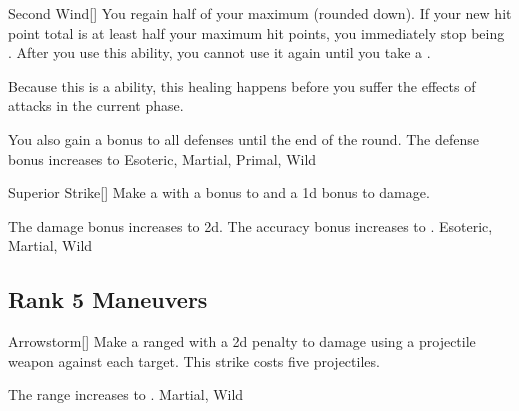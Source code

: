 \lowercase{\hypertarget{maneuver:Second Wind}{}}\label{maneuver:Second Wind}
\hypertarget{maneuver:Second Wind}{}
\begin{apability}[Rank 4]{Second Wind}[]
You regain half of your maximum  (rounded down).
If your new hit point total is at least half your maximum hit points, you immediately stop being .
After you use this ability, you cannot use it again until you take a .

Because this is a  ability, this healing happens before you suffer the effects of attacks in the current phase.

\rankline
{} You also gain a  bonus to all defenses until the end of the round.
 The defense bonus increases to 
 Esoteric, Martial, Primal, Wild
\end{apability}
\vspace{0.25em}



\lowercase{\hypertarget{maneuver:Superior Strike}{}}\label{maneuver:Superior Strike}
\hypertarget{maneuver:Superior Strike}{}
\begin{freeability}[Rank 4]{Superior Strike}[]
Make a  with a  bonus to  and a \plus1d bonus to damage.

\rankline
{} The damage bonus increases to \plus2d.
 The accuracy bonus increases to .
 Esoteric, Martial, Wild
\end{freeability}
\vspace{0.25em}


\subsection{Rank 5 Maneuvers}

\lowercase{\hypertarget{maneuver:Arrowstorm}{}}\label{maneuver:Arrowstorm}
\hypertarget{maneuver:Arrowstorm}{}
\begin{freeability}[Rank 5]{Arrowstorm}[]
Make a ranged  with a \minus2d penalty to damage using a projectile weapon against each target.
This strike costs five projectiles.

\rankline
{} The range increases to \rnglong.
 Martial, Wild
\end{freeability}
\vspace{0.25em}


